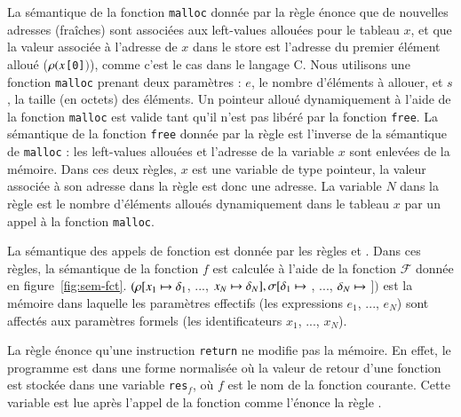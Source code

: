 La sémantique de la fonction \lstinline'malloc' donnée par la règle
 énonce que de nouvelles adresses (fraîches) sont associées
aux left-values allouées pour le tableau $x$, et que la valeur
associée à l'adresse de $x$ dans le store est l'adresse du premier
élément alloué ($\rho(x$\lstinline'[0]'$)$), comme c'est le cas dans le langage
C.
Nous utilisons une fonction \lstinline'malloc' prenant deux paramètres :
$e$, le nombre d'éléments à allouer, et $s$, la taille (en octets) des éléments.
Un pointeur alloué dynamiquement à l'aide de la fonction \lstinline'malloc' est
valide tant qu'il n'est pas libéré par la fonction \lstinline'free'.
La sémantique de la fonction \lstinline'free' donnée par la règle
 est l'inverse de la sémantique de \lstinline'malloc' : les
left-values allouées et l'adresse de la variable $x$ sont enlevées de la
mémoire.
Dans ces deux règles, $x$ est une variable de type pointeur, la
valeur associée à son adresse dans la règle  est donc une
adresse.
La variable $N$ dans la règle  est le nombre d'éléments alloués
dynamiquement dans le tableau $x$ par un appel à la fonction \lstinline'malloc'.

La sémantique des appels de fonction est donnée par les règles 
et .
Dans ces règles, la sémantique de la fonction $f$ est calculée à
l'aide de la fonction $\mathcal{F}$ donnée en figure~\ref{fig:sem-fct}.
$(\rho[x_1 \mapsto \delta_1$, ...,
  $x_N \mapsto \delta_N], \sigma[\delta_1 \mapsto$
  , ...,
  $\delta_N \mapsto$  $])$
est la mémoire dans laquelle les paramètres effectifs (les expressions
$e_1$, ..., $e_N$) sont affectés aux paramètres formels (les identificateurs
$x_1$, ..., $x_N$).


La règle  énonce qu'une instruction \lstinline'return' ne
modifie pas la mémoire.
En effet, le programme est dans une forme normalisée où la valeur de retour
d'une fonction est stockée dans une variable \lstinline'res'$_f$, où
$f$ est le nom de la fonction courante.
Cette variable est lue après l'appel de la fonction comme l'énonce la règle
.

